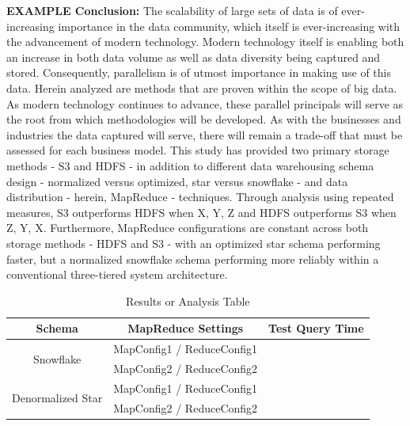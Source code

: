 \documentclass[journal]{IEEEtran}
\begin{document}
\textbf{EXAMPLE Conclusion:}
The scalability of large sets of data is of ever-increasing importance in the data community, which itself is ever-increasing with the advancement of modern technology. Modern technology itself is enabling both an increase in both data volume as well as data diversity being captured and stored. Consequently, parallelism is of utmost importance in making use of this data. Herein analyzed are methods that are proven within the scope of big data. As modern technology continues to advance, these parallel principals will serve as the root from which methodologies will be developed. As with the businesses and industries the data captured will serve, there will remain a trade-off that must be assessed for each business model. This study has provided two primary storage methods - S3 and HDFS - in addition to different data warehousing schema design - normalized versus optimized, star versus snowflake - and data distribution - herein, MapReduce - techniques. Through analysis using repeated measures, S3 outperforms HDFS when X, Y, Z and HDFS outperforms S3 when Z, Y, X. Furthermore, MapReduce configurations are constant across both storage methods - HDFS and S3 - with an optimized star schema performing faster, but a normalized snowflake schema performing more reliably within a conventional three-tiered system architecture.

\ifCLASSOPTIONcaptionsoff
  \newpage
\fi

\begin{table}
    \renewcommand{\arraystretch}{1.3}
    \caption{Results or Analysis Table}
    \label{ResultsTable}
    \centering
    \begin{tabular}{c|c|c}
        \hline
        \hline
        Schema               & MapReduce Settings                   & Test Query Time\\
        \hline
        \multirow{2}{*}{Snowflake}  & MapConfig1 / ReduceConfig1    &  \\
        \cline{2-3}
                             & MapConfig2 / ReduceConfig2           &  \\
        \hline
        \multirow{2}{*}{Denormalized Star}  & MapConfig1 / ReduceConfig1 &  \\
        \cline{2-3}

                             & MapConfig2 / ReduceConfig2           &  \\
        \hline
        \hline
    \end{tabular}
\end{table}
\end{document}
